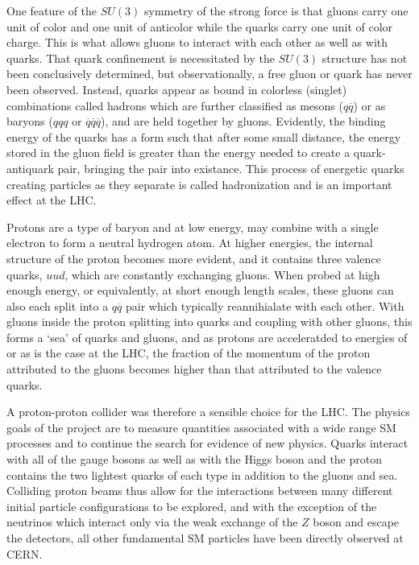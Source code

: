  One feature of the $SU(3)$ symmetry of the
  strong force is that gluons
  carry one unit of color and one unit of anticolor
  while the quarks carry one unit of color charge.
 This is what allows gluons to interact with each other
  as well as with quarks.
 That quark confinement is necessitated by the $SU(3)$
  structure has not been conclusively determined, 
  but observationally, a free gluon or quark has 
  never been observed.
 Instead, quarks appear as bound in colorless (singlet)
  combinations called hadrons
  which are further classified as mesons ($q\overline{q}$)
  or as baryons ($qqq$ or
  $\overline{q}\overline{q}\overline{q}$),
  and are held together by gluons.
 Evidently, the binding energy of the
  quarks has a form such that
  after some small distance, the energy
  stored in the gluon field is greater
  than the energy needed to create a
  quark-antiquark pair, bringing the pair
  into existance.
 This process of energetic quarks
  creating particles as they
  separate is called hadronization
  and is an important effect at the LHC.

 Protons are a type of baryon and
  at low energy, may combine with a single electron 
  to form a neutral hydrogen atom.
 At higher energies, the internal structure 
  of the proton becomes more evident,
  and it contains three valence quarks, $uud$, 
  which are constantly exchanging gluons.
 When probed at high enough energy, or equivalently,
  at short enough length scales, these 
  gluons can also each split into a $q\overline{q}$ pair 
  which typically reannihialate with each other.
 With gluons inside the proton splitting into quarks
  and coupling with other gluons,
  this forms a `sea' of quarks and gluons,
  and as protons are acceleratded
  to energies of \GeV or \TeV as is the case at the
  LHC, the fraction of the momentum of the
  proton attributed to the gluons becomes higher 
  than that attributed to the valence quarks.

 A proton-proton collider was therefore a 
  sensible choice for the LHC. 
 The physics goals of the project are
  to measure quantities associated with a wide range SM 
  processes and to continue the search for 
  evidence of new physics.
 Quarks interact with all of the gauge bosons
  as well as with the Higgs boson
  and the proton contains the two lightest
  quarks of each type
  in addition to the gluons and sea.
 Colliding proton beams thus allow for
  the interactions between many different
  initial particle configurations to be explored,
  and with the exception of the neutrinos which 
  interact only via the weak exchange of the $Z$
  boson and escape the detectors,
  all other fundamental SM particles have been
  directly  observed  at CERN. 

